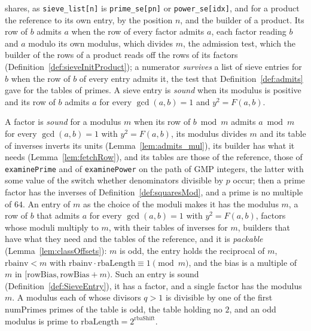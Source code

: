 \begin{definition}
  shares, as \verb|sieve_list[n]| is \verb|prime_se[pn]| or \verb|power_se[idx]|, and for a product
  the reference to its own entry, by the position $n$, and the builder of a product. Its row of $b$
  admits $a$ when the row of every factor admits $a$, each factor reading $b$ and $a$ modulo its own
  modulus, which divides $m$, the admission test, which the builder of the rows of a product reads
  off the rows of its factors (Definition~\ref{def:sieveInitProduct}); a numerator \emph{survives} a
  list of sieve entries for $b$ when the row of $b$ of every entry admits it, the test that
  Definition~\ref{def:admits} gave for the tables of primes. A sieve entry is \emph{sound} when its
  modulus is positive and its row of $b$ admits $a$ for every $\gcd(a, b) = 1$ and $y^2 = F(a, b)$.
\end{definition}

\begin{lemma}\label{lem:sieveEntry_admits}
  \leanok
  A factor is \emph{sound} for a modulus $m$ when its row of $b \bmod m$ admits $a \bmod m$ for
  every $\gcd(a, b) = 1$ with $y^2 = F(a, b)$, its modulus divides $m$ and its table of inverses
  inverts its units (Lemma~\ref{lem:admits_mul}), its builder has what it needs
  (Lemma~\ref{lem:fetchRow}), and its tables are those of the reference, those of
  \verb|examinePrime| and of \verb|examinePower| on the path of GMP integers, the latter with some
  value of the switch whether denominators divisible by $p$ occur; then a prime factor has the
  inverses of Definition~\ref{def:squaresMod}, and a prime is no multiple of $64$. An entry of $m$
  as the choice of the moduli makes it has the modulus $m$, a row of $b$ that admits $a$ for every
  $\gcd(a, b) = 1$ with $y^2 = F(a, b)$, factors whose moduli multiply to $m$, with their tables of
  inverses for $m$, builders that have what they need and the tables of the reference, and it is
  \emph{packable} (Lemma~\ref{lem:classOffsets}): $m$ is odd, the entry holds the reciprocal of $m$,
  $\mathrm{rbainv} < m$ with $\mathrm{rbainv} \cdot \mathrm{rbaLength} \equiv 1 \pmod m$, and the
  bias is a multiple of $m$ in $[\mathrm{rowBias}, \mathrm{rowBias} + m)$. Such an entry is sound
  (Definition~\ref{def:SieveEntry}), it has a factor, and a single factor has the modulus $m$. A
  modulus each of whose divisors $q > 1$ is divisible by one of the first $\mathrm{numPrimes}$
  primes of the table is odd, the table holding no $2$, and an odd modulus is prime to
  $\mathrm{rbaLength} = 2^{\mathrm{rbaShift}}$.
\end{lemma}

